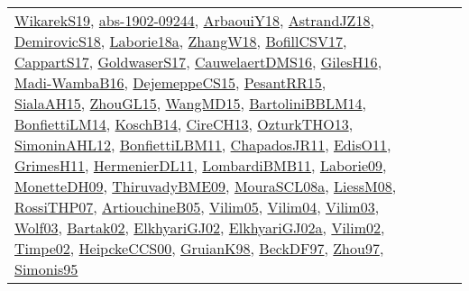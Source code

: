 {\begin{longtable}{lp{3cm}>{\raggedright}p{6cm}>{\raggedright}p{6cm}p{8cm}}
\href{articles/WikarekS19.pdf}{WikarekS19}\cite{WikarekS19}, \href{articles/abs-1902-09244.pdf}{abs-1902-09244}\cite{abs-1902-09244}, \href{papers/ArbaouiY18.pdf}{ArbaouiY18}\cite{ArbaouiY18}, \href{papers/AstrandJZ18.pdf}{AstrandJZ18}\cite{AstrandJZ18}, \href{papers/DemirovicS18.pdf}{DemirovicS18}\cite{DemirovicS18}, \href{papers/Laborie18a.pdf}{Laborie18a}\cite{Laborie18a}, \href{articles/ZhangW18.pdf}{ZhangW18}\cite{ZhangW18}, \href{papers/BofillCSV17.pdf}{BofillCSV17}\cite{BofillCSV17}, \href{papers/CappartS17.pdf}{CappartS17}\cite{CappartS17}, \href{papers/GoldwaserS17.pdf}{GoldwaserS17}\cite{GoldwaserS17}, \href{papers/CauwelaertDMS16.pdf}{CauwelaertDMS16}\cite{CauwelaertDMS16}, \href{papers/GilesH16.pdf}{GilesH16}\cite{GilesH16}, \href{papers/Madi-WambaB16.pdf}{Madi-WambaB16}\cite{Madi-WambaB16}, \href{papers/DejemeppeCS15.pdf}{DejemeppeCS15}\cite{DejemeppeCS15}, \href{papers/PesantRR15.pdf}{PesantRR15}\cite{PesantRR15}, \href{papers/SialaAH15.pdf}{SialaAH15}\cite{SialaAH15}, \href{papers/ZhouGL15.pdf}{ZhouGL15}\cite{ZhouGL15}, \href{articles/WangMD15.pdf}{WangMD15}\cite{WangMD15}, \href{papers/BartoliniBBLM14.pdf}{BartoliniBBLM14}\cite{BartoliniBBLM14}, \href{papers/BonfiettiLM14.pdf}{BonfiettiLM14}\cite{BonfiettiLM14}, \href{papers/KoschB14.pdf}{KoschB14}\cite{KoschB14}, \href{papers/CireCH13.pdf}{CireCH13}\cite{CireCH13}, \href{articles/OzturkTHO13.pdf}{OzturkTHO13}\cite{OzturkTHO13}, \href{papers/SimoninAHL12.pdf}{SimoninAHL12}\cite{SimoninAHL12}, \href{papers/BonfiettiLBM11.pdf}{BonfiettiLBM11}\cite{BonfiettiLBM11}, \href{papers/ChapadosJR11.pdf}{ChapadosJR11}\cite{ChapadosJR11}, \href{papers/EdisO11.pdf}{EdisO11}\cite{EdisO11}, \href{papers/GrimesH11.pdf}{GrimesH11}\cite{GrimesH11}, \href{papers/HermenierDL11.pdf}{HermenierDL11}\cite{HermenierDL11}, \href{papers/LombardiBMB11.pdf}{LombardiBMB11}\cite{LombardiBMB11}, \href{papers/Laborie09.pdf}{Laborie09}\cite{Laborie09}, \href{papers/MonetteDH09.pdf}{MonetteDH09}\cite{MonetteDH09}, \href{papers/ThiruvadyBME09.pdf}{ThiruvadyBME09}\cite{ThiruvadyBME09}, \href{papers/MouraSCL08a.pdf}{MouraSCL08a}\cite{MouraSCL08a}, \href{articles/LiessM08.pdf}{LiessM08}\cite{LiessM08}, \href{papers/RossiTHP07.pdf}{RossiTHP07}\cite{RossiTHP07}, \href{papers/ArtiouchineB05.pdf}{ArtiouchineB05}\cite{ArtiouchineB05}, \href{papers/Vilim05.pdf}{Vilim05}\cite{Vilim05}, \href{papers/Vilim04.pdf}{Vilim04}\cite{Vilim04}, \href{papers/Vilim03.pdf}{Vilim03}\cite{Vilim03}, \href{papers/Wolf03.pdf}{Wolf03}\cite{Wolf03}, \href{papers/Bartak02.pdf}{Bartak02}\cite{Bartak02}, \href{papers/ElkhyariGJ02.pdf}{ElkhyariGJ02}\cite{ElkhyariGJ02}, \href{papers/ElkhyariGJ02a.pdf}{ElkhyariGJ02a}\cite{ElkhyariGJ02a}, \href{papers/Vilim02.pdf}{Vilim02}\cite{Vilim02}, \href{articles/Timpe02.pdf}{Timpe02}\cite{Timpe02}, \href{articles/HeipckeCCS00.pdf}{HeipckeCCS00}\cite{HeipckeCCS00}, \href{papers/GruianK98.pdf}{GruianK98}\cite{GruianK98}, \href{papers/BeckDF97.pdf}{BeckDF97}\cite{BeckDF97}, \href{articles/Zhou97.pdf}{Zhou97}\cite{Zhou97}, \href{papers/Simonis95.pdf}{Simonis95}\cite{Simonis95}\\

\end{longtable}}
